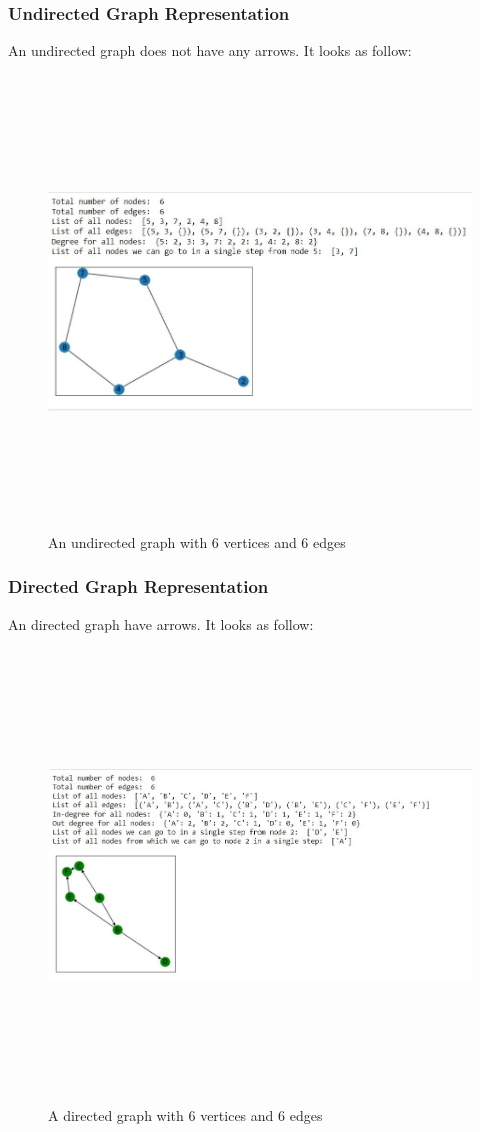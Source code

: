 \documentclass[12pt,runningheads]{article}
\begin{document}
\subsubsection{Undirected Graph Representation}
An undirected graph does not have any arrows. It looks as follow:

\begin{figure}[htp]
    \centering
    \includegraphics[width=12cm,height=12cm]{undirectedgraph.JPG}
    \caption{An undirected graph with 6 vertices and 6 edges}
    \label{fig:galaxy}
\end{figure}
\subsubsection{Directed Graph Representation}
An directed graph have arrows. It looks as follow:

\begin{figure}[htp]
    \centering
    \includegraphics[width=12cm,height=12cm]{directedgraph.JPG}
    \caption{A directed graph with 6 vertices and 6 edges}
    \label{fig:galaxy}
\end{figure}
\end{document}
